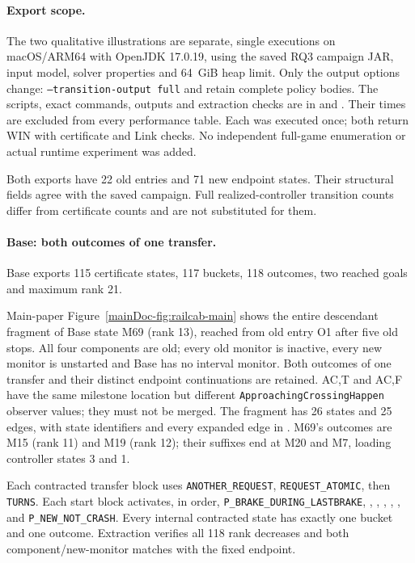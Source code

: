 \documentclass[11pt]{article}
\begin{document}
\paragraph{Export scope.}
The two qualitative illustrations are separate, single executions on macOS/ARM64 with OpenJDK 17.0.19, using the saved RQ3 campaign JAR, input model, solver properties and 64~GiB heap limit. Only the output options change: \texttt{--transition-output full} and  retain complete policy bodies. The scripts, exact commands, outputs and extraction checks are in  and . Their times are excluded from every performance table. Each was executed once; both return WIN with certificate and Link checks. No independent full-game enumeration or actual runtime experiment was added.

Both exports have 22 old entries and 71 new endpoint states. Their structural fields agree with the saved campaign. Full realized-controller transition counts differ from certificate counts and are not substituted for them.

\paragraph{Base: both outcomes of one transfer.}
Base exports 115 certificate states, 117 buckets, 118 outcomes, two reached goals and maximum rank 21.

Main-paper Figure~\ref{mainDoc-fig:railcab-main} shows the entire descendant fragment of Base state M69 (rank 13), reached from old entry O1 after five old stops. All four components are old; every old monitor is inactive, every new monitor is unstarted and Base has no interval monitor. Both outcomes of one transfer and their distinct endpoint continuations are retained. AC,T and AC,F have the same milestone location but different \texttt{ApproachingCrossingHappen} observer values; they must not be merged. The fragment has 26 states and 25 edges, with state identifiers and every expanded edge in . M69's outcomes are M15 (rank 11) and M19 (rank 12); their suffixes end at M20 and M7, loading controller states 3 and 1.

Each contracted transfer block uses \texttt{ANOTHER\_REQUEST}, \texttt{REQUEST\_ATOMIC}, then \texttt{TURNS}. Each start block activates, in order, \texttt{P\_BRAKE\_DURING\_LASTBRAKE}, , , , , , and \texttt{P\_NEW\_NOT\_CRASH}. Every internal contracted state has exactly one bucket and one outcome. Extraction verifies all 118 rank decreases and both component/new-monitor matches with the fixed endpoint.
\end{document}
